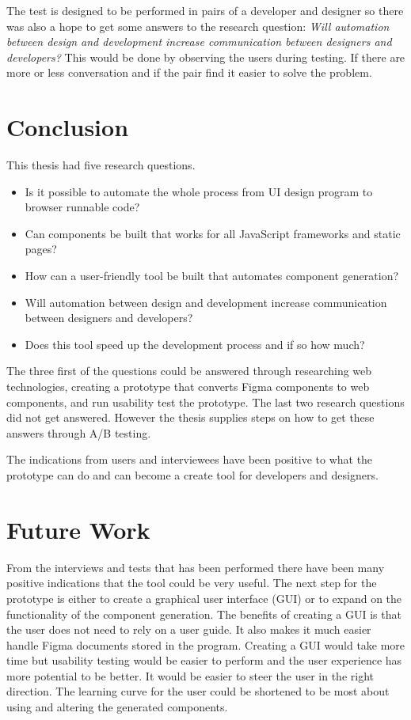 The test is designed to be performed in pairs of a developer and designer so there was also a hope to get some answers to the research question: \textit{Will automation between design and development increase communication between designers and developers?} This would be done by observing the users during testing. If there are more or less conversation and if the pair find it easier to solve the problem.

\newpage
\section{Conclusion}
\label{sub:conclusion}
This thesis had five research questions.  
\begin{itemize}
  \item Is it possible to automate the whole process from UI design program to browser runnable code? 
 \item Can components be built that works for all JavaScript frameworks and static pages?
  \item How can a user-friendly tool be built that automates component generation?  
  \item Will automation between design and development increase communication between designers and developers?
  \item Does this tool speed up the development process and if so how much?
\end{itemize}

The three first of the questions could be answered through researching web technologies, creating a prototype that converts Figma components to web components, and run usability test the prototype. The last two research questions did not get answered. However the thesis supplies steps on how to get these answers through A/B testing.

The indications from users and interviewees have been positive to what the prototype can do and can become a create tool for developers and designers.

\section{Future Work}%
\label{sub:Future Work}

From the interviews and tests that has been performed there have been many positive indications that the tool could be very useful. The next step for the prototype is either to create a graphical user interface (GUI) or to expand on the functionality of the component generation. The benefits of creating a GUI is that the user does not need to rely on a user guide. It also makes it much easier handle Figma documents stored in the program. Creating a GUI would take more time but usability testing would be easier to perform and the user experience has more potential to be better. It would be easier to steer the user in the right direction. The learning curve for the user could be shortened to be most about using and altering the generated components. 

